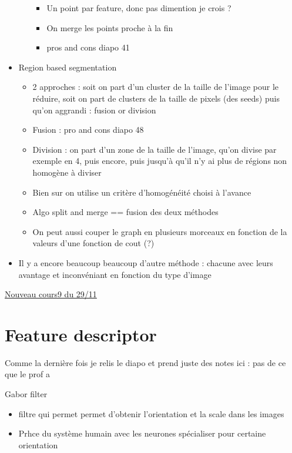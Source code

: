 \documentclass{article}
\theoremstyle{plain}%
\theoremstyle{definition}
\theoremstyle{remark}
\begin{document}
\begin{itemize}
\begin{itemize}
\begin{itemize}
            \item Un point par feature, donc pas dimention je crois ? 
            \item On merge les points proche à la fin
            \item pros and cons diapo 41
        \end{itemize}
    \end{itemize}
    \item Region based segmentation
    \begin{itemize}
        \item 2 approches : soit on part d'un cluster de la taille de l'image pour le réduire, soit on part de clusters de la taille de pixels (des seeds) puis qu'on aggrandi : fusion or division
        \item Fusion : pro and cons diapo 48
        \item Division : on part d'un zone de la taille de l'image, qu'on divise par exemple en 4, puis encore, puis jusqu'à qu'il n'y ai plus de régions non homogène à diviser
        \item Bien sur on utilise un critère d'homogénéité choisi à l'avance 
        \item Algo split and merge == fusion des deux méthodes
        \item On peut aussi couper le graph en plusieurs morceaux en fonction de la valeurs d'une fonction de cout (?)
    \end{itemize}
    \item Il y a encore beaucoup beaucoup d'autre méthode : chacune avec leurs avantage et inconvéniant en fonction du type d'image 
\end{itemize}

\underline{Nouveau cours9 du 29/11} \\
\section{Feature descriptor}
Comme la dernière fois je relis le diapo et prend juste des notes ici : pas de ce que le prof a \displaystyle 

Gabor filter
\begin{itemize}
    \item filtre qui permet permet d'obtenir l'orientation et la scale dans les images
    \item Prhce du système humain avec les neurones spécialiser pour certaine orientation
\end{itemize}
\end{document}
